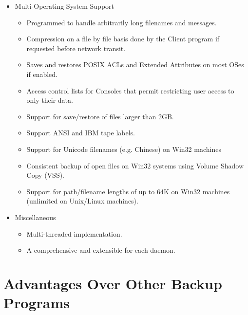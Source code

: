 \begin{itemize}
\item Multi-Operating System Support
   \begin{itemize}
   \item Programmed to handle arbitrarily long filenames and messages.
   \item Compression on a file by file basis done by the Client program  if
      requested before network transit.
    \item Saves and restores POSIX ACLs and Extended Attributes on most OSes if
      enabled.
   \item Access control lists for Consoles that permit restricting user access
      to only their data.
   \item Support for save/restore of files larger than 2GB.
   \item Support ANSI and IBM tape labels.
   \item Support for Unicode filenames (e.g. Chinese) on Win32 machines
   \item Consistent backup of open files on Win32 systems using Volume Shadow Copy (VSS).
   \item Support for path/filename lengths of up to 64K on Win32 machines
         (unlimited on Unix/Linux machines).
   \end{itemize}

\item Miscellaneous
   \begin{itemize}
   \item Multi-threaded implementation.
   \item A comprehensive and extensible
       for each daemon.
   \end{itemize}
\end{itemize}

\section{Advantages Over Other Backup Programs}

